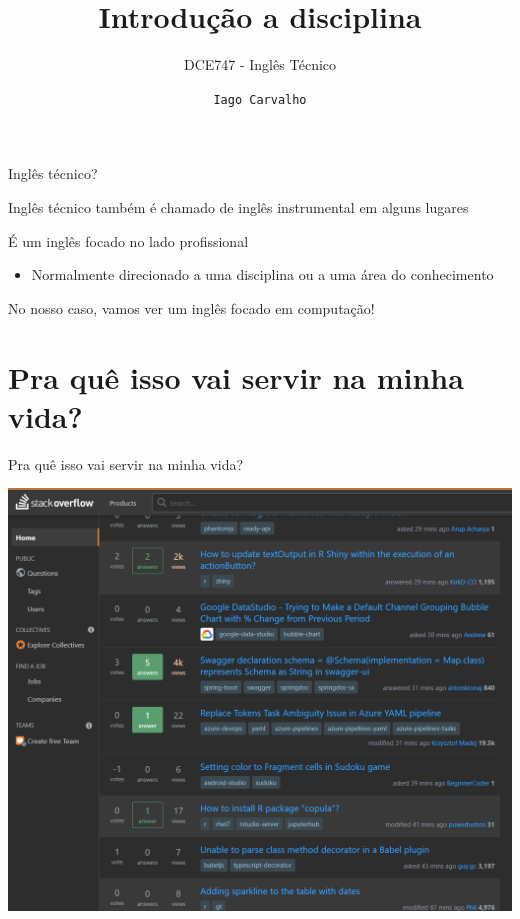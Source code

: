 \documentclass[compress,mathserif]{beamer}
\title{Introdução a disciplina}
\subtitle{DCE747 - Inglês Técnico}
\author{\texttt{Iago Carvalho}}
\institute{\texttt{Departamento de Ciência da Computação}}
\begin{document}
\begin{frame}
\titlepage

\end{frame}


\begin{frame}{Inglês técnico?}

Inglês técnico também é chamado de inglês instrumental em alguns lugares

\vspace{0.5cm}

É um inglês focado no lado profissional
\begin{itemize}
    \item Normalmente direcionado a uma disciplina ou a uma área do conhecimento
\end{itemize}

\vspace{0.5cm}

No nosso caso, vamos ver um inglês focado em computação!

\end{frame}

\section{Pra quê isso vai servir na minha vida?}


\begin{frame}{Pra quê isso vai servir na minha vida?}

\centering \includegraphics[width=\textwidth]{images/so.png}
\end{frame}
\end{document}
